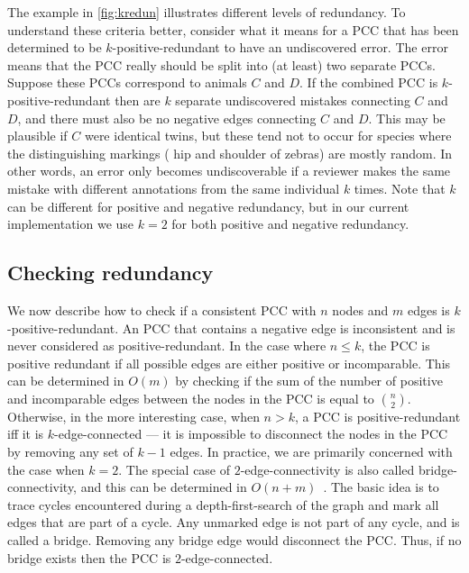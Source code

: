 The example in \cref{fig:kredun} illustrates different levels of redundancy.
To understand these criteria better, consider what it means for a PCC that has been determined to be
  $k$-positive-redundant to have an undiscovered error.
The error means that the PCC really should be split into (at least) two separate PCCs.
Suppose these PCCs correspond to animals $C$ and $D$.
If the combined PCC is $k$-positive-redundant then are $k$ separate undiscovered mistakes connecting $C$ and $D$,
  and there must also be no negative edges connecting $C$ and $D$.
This may be plausible if $C$ were identical twins, but these tend not to occur for species where the
  distinguishing markings (\eg{} hip and shoulder of zebras) are mostly random.
In other words, an error only becomes undiscoverable if a reviewer makes the same mistake with different
  annotations from the same individual $k$ times.
Note that $k$ can be different for positive and negative redundancy, but in our current implementation we use
  $k=2$ for both positive and negative redundancy.


\subsection{Checking redundancy}

We now describe how to check if a consistent PCC with $n$ nodes and $m$ edges is $k$-positive-redundant.
An PCC that contains a negative edge is inconsistent and is never considered as positive-redundant.
In the case where $n \leq k$, the PCC is positive redundant if all possible edges are either positive or
  incomparable.
This can be determined in $O(m)$ by checking if the sum of the number of positive and incomparable edges between
  the nodes in the PCC is equal to $\binom{n}{2}$.
Otherwise, in the more interesting case, when $n > k$, a PCC is positive-redundant iff it is $k$-edge-connected
  --- \ie{} it is impossible to disconnect the nodes in the PCC by removing any set of $k - 1$ edges.
In practice, we are primarily concerned with the case when $k=2$.
The special case of $2$-edge-connectivity is also called bridge-connectivity, and this can be determined in %
$O(n + m)$~\cite{eswaran_augmentation_1976,wang_simple_2015}.
The basic idea is to trace cycles encountered during a depth-first-search of the graph and mark all edges that
  are part of a cycle.
Any unmarked edge is not part of any cycle, and is called a bridge.
Removing any bridge edge would disconnect the PCC.
Thus, if no bridge exists then the PCC is $2$-edge-connected.

